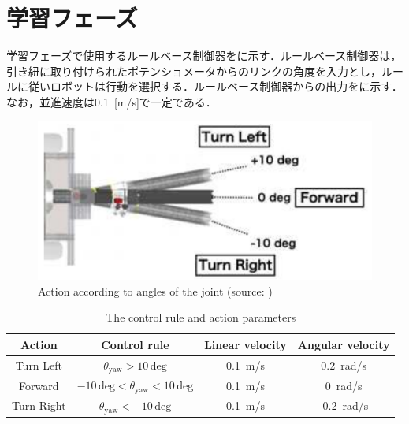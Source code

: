 
\section{学習フェーズ}

  学習フェーズで使用するルールベース制御器をに示す．ルールベース制御器は，引き紐に取り付けられたポテンショメータからのリンクの角度を入力とし，ルールに従いロボットは行動を選択する．ルールベース制御器からの出力をに示す．なお，並進速度は0.1 \,[m/s]で一定である．

  \vspace{1cm}

  \begin{figure}[h]
    \centering
    \includegraphics[keepaspectratio, scale=1.1] {images/pdf/okada_rule-based_contoroller}
    \caption[Action according to angles of the joint]{Action according to angles of the joint (source: \cite{okada})}
    \label{Fig:okada_rule-based_contoroller}
  \end{figure}

  \vspace{1cm}

  \begin{table}[ht]
    \caption{The control rule and action parameters}
    \label{tab:actions_control_parameters}
    \centering
    \begin{tabular}{cccc}
    \hline
    Action & Control rule & Linear velocity & Angular velocity \\ 
    \hline
    \hline
    Turn Left & $\theta_{\mathrm{yaw}} > 10 \, \mathrm{deg}$ & 0.1 \,m/s & 0.2 \,rad/s \\ 
    Forward & $-10 \, \mathrm{deg} < \theta_{\mathrm{yaw}} < 10 \, \mathrm{deg}$ & 0.1 \,m/s & 0 \,rad/s \\ 
    Turn Right & $\theta_{\mathrm{yaw}} < -10 \, \mathrm{deg}$ & 0.1 \,m/s & -0.2 \,rad/s \\ 
    \hline
    \end{tabular}
    \end{table}
  
\newpage